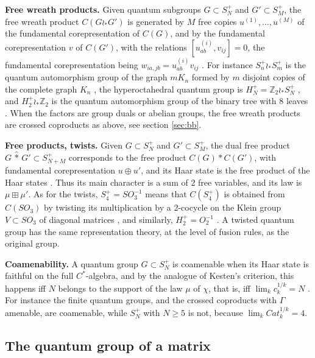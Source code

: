 \documentclass[11pt]{amsart}
\begin{document}
\medskip

\noindent\textbf{Free wreath products.} Given quantum subgroups $G\subset S_N^+$ and $G'\subset S_M^+$, the free wreath product $C(G\wr_*G')$ is generated by $M$ free copies $u^{(1)},\ldots,u^{(M)}$ of the fundamental corepresentation of $C(G)$, and by the fundamental corepresentation $v$ of $C(G')$, with the relations $[u^{(i)}_{ab},v_{ij}]=0$, the fundamental corepresentation being $w_{ia,jb}=u^{(i)}_{ab}v_{ij}$ \cite{bi0}. For instance $S_n^+\wr_*S_m^+$ is the quantum automorphism group of the graph $mK_n$ formed by $m$ disjoint copies of the complete graph $K_n$ \cite{bb4}, the hyperoctahedral quantum group is $H_N^+=\mathbb Z_2\wr_*S_N^+$ \cite{bbc}, and $H_2^+\wr_*\mathbb Z_2$ is the quantum automorphism group of the binary tree with 8 leaves \cite{dkr,dfk}. When the factors are group duals or abelian groups, the free wreath products are crossed coproducts as above, see section \ref{sec:bb}.

\medskip

\noindent\textbf{Free products, twists.} Given $G\subset S_N^+$ and $G'\subset S_M^+$, the dual free product $G\,\hat{*}\,G'\subset S_{N+M}^+$ corresponds to the free product $C(G)*C(G')$, with fundamental corepresentation $u\oplus u'$, and its Haar state is the free product of the Haar states \cite{wa0}. Thus its main character is a sum of 2 free variables, and its law is $\mu\boxplus\mu'$. As for the twists, $S_4^+=SO_3^{-1}$ means that $C(S_4^+)$ is obtained from $C(SO_3)$ by twisting its multiplication by a 2-cocycle on the Klein group $V\subset SO_3$ of diagonal matrices \cite{bb2}, and similarly, $H_2^+=O_2^{-1}$ \cite{bbc}. A twisted quantum group has the same representation theory, at the level of fusion rules, as the original group.

\medskip

\noindent\textbf{Coamenability.} A quantum group $G\subset S_N^+$ is coamenable when its Haar state is faithful on the full $C^*$-algebra, and by the analogue of Kesten's criterion, this happens iff $N$ belongs to the support of the law $\mu$ of $\chi$, that is, iff $\lim_kc_k^{1/k}=N$ \cite{ba3x}. For instance the finite quantum groups, and the crossed coproducts with $\Gamma$ amenable, are coamenable, while $S_N^+$ with $N\geq5$ is not, because $\lim_kCat_k^{1/k}=4$.

\subsection{The quantum group of a matrix}\label{sec:qg}
\end{document}
